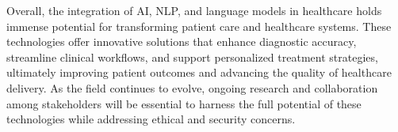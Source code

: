 Overall, the integration of AI, NLP, and language models in healthcare holds immense potential for transforming patient care and healthcare systems. These technologies offer innovative solutions that enhance diagnostic accuracy, streamline clinical workflows, and support personalized treatment strategies, ultimately improving patient outcomes and advancing the quality of healthcare delivery. As the field continues to evolve, ongoing research and collaboration among stakeholders will be essential to harness the full potential of these technologies while addressing ethical and security concerns.